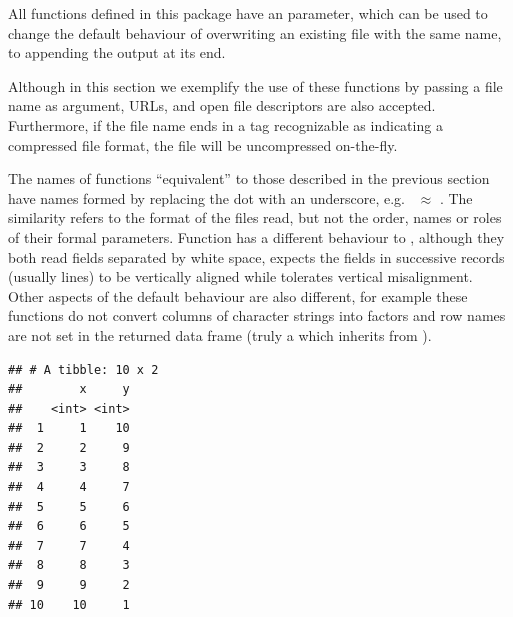 \documentclass[krantz2]{krantz}\usepackage{knitr}%
\begin{document}
All  functions defined in this package have an  parameter, which can be used to change the default behaviour of overwriting an existing file with the same name, to appending the output at its end.

Although in this section we exemplify the use of these functions by passing a file name as argument, URLs, and open file descriptors are also accepted. Furthermore, if the file name ends in a tag recognizable as indicating a compressed file format, the file will be uncompressed on-the-fly.

\begin{warningbox}
The names of functions ``equivalent'' to those described in the previous section have names formed by replacing the dot with an underscore, e.g.\  $\approx$ . The similarity refers to the format of the files read, but not the order, names or roles of their formal parameters. Function  has a different behaviour to , although they both read fields separated by white space,  expects the fields in successive records (usually lines) to be vertically aligned while  tolerates vertical misalignment. Other aspects of the default behaviour are also different, for example these functions do not convert columns of character strings into factors and row names are not set in the returned data frame (truly a  which inherits from ).
\end{warningbox}

\begin{knitrout}\footnotesize
{}\color{fgcolor}\begin{kframe}
\begin{alltt}
\hlstd{(} \hlstd{=} \hlstd{)}
\end{alltt}


{\ttfamily\noindent\itshape\color{messagecolor}{\#\# Parsed with column specification:\\\#\# cols(\\\#\#\ \  x = col\_integer(),\\\#\#\ \  y = col\_integer()\\\#\# )}}\begin{verbatim}
## # A tibble: 10 x 2
##        x     y
##    <int> <int>
##  1     1    10
##  2     2     9
##  3     3     8
##  4     4     7
##  5     5     6
##  6     6     5
##  7     7     4
##  8     8     3
##  9     9     2
## 10    10     1
\end{verbatim}
\end{kframe}
\end{knitrout}
\end{document}
